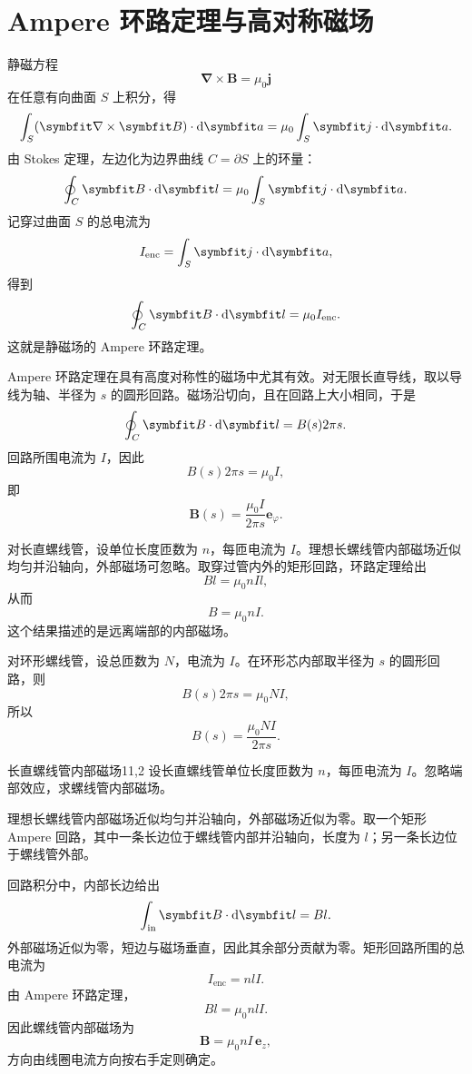 \section{Ampere 环路定理与高对称磁场}

静磁方程
\[
\bm{\nabla}\times\bm{B}
=
\mu_{0}\bm{j}
\]
在任意有向曲面 $S$ 上积分，得
\[
\int_{S}
(\bm{\nabla}\times\bm{B})\cdot\dif\bm{a}
=
\mu_{0}
\int_{S}
\bm{j}\cdot\dif\bm{a}.
\]
由 Stokes 定理，左边化为边界曲线 $C=\partial S$ 上的环量：
\[
\oint_{C}
\bm{B}\cdot\dif\bm{l}
=
\mu_{0}
\int_{S}
\bm{j}\cdot\dif\bm{a}.
\]
记穿过曲面 $S$ 的总电流为
\[
I_{\mathrm{enc}}
=
\int_{S}
\bm{j}\cdot\dif\bm{a},
\]
得到
\begin{equation}
	\oint_{C}
	\bm{B}\cdot\dif\bm{l}
	=
	\mu_{0}I_{\mathrm{enc}}.
	\label{eq:11:ampere-law}
\end{equation}
这就是静磁场的 Ampere 环路定理。

Ampere 环路定理在具有高度对称性的磁场中尤其有效。对无限长直导线，取以导线为轴、半径为 $s$ 的圆形回路。磁场沿切向，且在回路上大小相同，于是
\[
\oint_{C}\bm{B}\cdot\dif\bm{l}
=
B(s)2\pi s.
\]
回路所围电流为 $I$，因此
\[
B(s)2\pi s
=
\mu_{0}I,
\]
即
\[
\bm{B}(s)
=
\frac{\mu_{0}I}{2\pi s}\bm{e}_{\varphi}.
\]

对长直螺线管，设单位长度匝数为 $n$，每匝电流为 $I$。理想长螺线管内部磁场近似均匀并沿轴向，外部磁场可忽略。取穿过管内外的矩形回路，环路定理给出
\[
Bl
=
\mu_{0}nIl,
\]
从而
\[
B
=
\mu_{0}nI.
\]
这个结果描述的是远离端部的内部磁场。

对环形螺线管，设总匝数为 $N$，电流为 $I$。在环形芯内部取半径为 $s$ 的圆形回路，则
\[
B(s)2\pi s
=
\mu_{0}NI,
\]
所以
\[
B(s)
=
\frac{\mu_{0}NI}{2\pi s}.
\]

\begin{example}{长直螺线管内部磁场}{11,2}
	设长直螺线管单位长度匝数为 $n$，每匝电流为 $I$。忽略端部效应，求螺线管内部磁场。
	
	\begin{solution}
		理想长螺线管内部磁场近似均匀并沿轴向，外部磁场近似为零。取一个矩形 Ampere 回路，其中一条长边位于螺线管内部并沿轴向，长度为 $l$；另一条长边位于螺线管外部。
		
		回路积分中，内部长边给出
		\[
		\int_{\mathrm{in}}\bm{B}\cdot\dif\bm{l}=Bl.
		\]
		外部磁场近似为零，短边与磁场垂直，因此其余部分贡献为零。矩形回路所围的总电流为
		\[
		I_{\mathrm{enc}}=nlI.
		\]
		由 Ampere 环路定理，
		\[
		Bl=\mu_{0}nlI.
		\]
		因此螺线管内部磁场为
		\[
		\bm{B}
		=
		\mu_{0}nI\,\bm{e}_{z},
		\]
		方向由线圈电流方向按右手定则确定。
	\end{solution}
\end{example}

